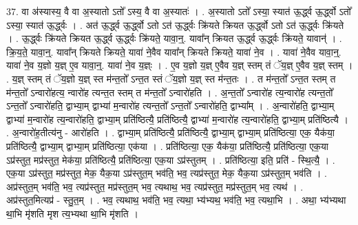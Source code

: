 \documentclass[17pt]{extarticle}
\begin{document}
37. वा अ॑स्यास्य॒ वै वा अ॒स्यातो ऽतो᳚ ऽस्य॒ वै वा अ॒स्यातः॑ । . अ॒स्यातो ऽतो᳚ ऽस्या॒ स्यात॑ ऊ॒र्द्ध्व ऊ॒र्द्ध्वो ऽतो᳚ ऽस्या॒ स्यात॑ ऊ॒र्द्ध्वः । . अत॑ ऊ॒र्द्ध्व ऊ॒र्द्ध्वो ऽतो ऽत॑ ऊ॒र्द्ध्वः क्रि॑यते क्रियत ऊ॒र्द्ध्वो ऽतो ऽत॑ ऊ॒र्द्ध्वः क्रि॑यते । . ऊ॒र्द्ध्वः क्रि॑यते क्रियत ऊ॒र्द्ध्व ऊ॒र्द्ध्वः क्रि॑यते॒ यावा॒न्॒. यावा᳚न् क्रियत ऊ॒र्द्ध्व ऊ॒र्द्ध्वः क्रि॑यते॒ यावान्॑ । . क्रि॒य॒ते॒ यावा॒न्॒. यावा᳚न् क्रियते क्रियते॒ यावा॑ ने॒वैव यावा᳚न् क्रियते क्रियते॒ यावा॑ ने॒व । . यावा॑ ने॒वैव यावा॒न्॒. यावा॑ ने॒व य॒ज्ञो य॒ज्ञ् ए॒व यावा॒न्॒. यावा॑ ने॒व य॒ज्ञ्ः । . ए॒व य॒ज्ञो य॒ज्ञ् ए॒वैव य॒ज्ञ् स्तम् तं ॅय॒ज्ञ् ए॒वैव य॒ज्ञ् स्तम् । . य॒ज्ञ् स्तम् तं ॅय॒ज्ञो य॒ज्ञ् स्त म॑न्त॒तो᳚ ऽन्त॒त स्तं ॅय॒ज्ञो य॒ज्ञ् स्त म॑न्त॒तः । . त म॑न्त॒तो᳚ ऽन्त॒त स्तम् त म॑न्त॒तो᳚ ऽन्वारो॑हत्य॒ न्वारो॑ह त्यन्त॒त स्तम् त म॑न्त॒तो᳚ ऽन्वारो॑हति । . अ॒न्त॒तो᳚ ऽन्वारो॑ह त्य॒न्वारो॑ह त्यन्त॒तो᳚ ऽन्त॒तो᳚ ऽन्वारो॑हति॒ द्वाभ्या॒म् द्वाभ्या॑ म॒न्वारो॑ह त्यन्त॒तो᳚ ऽन्त॒तो᳚ ऽन्वारो॑हति॒ द्वाभ्या᳚म् । . अ॒न्वारो॑हति॒ द्वाभ्या॒म् द्वाभ्या॑ म॒न्वारो॑ह त्य॒न्वारो॑हति॒ द्वाभ्या॒म् प्रति॑ष्ठित्यै॒ प्रति॑ष्ठित्यै॒ द्वाभ्या॑ म॒न्वारो॑ह त्य॒न्वारो॑हति॒ द्वाभ्या॒म् प्रति॑ष्ठित्यै । . अ॒न्वारो॑ह॒तीत्य॑नु - आरो॑हति । . द्वाभ्या॒म् प्रति॑ष्ठित्यै॒ प्रति॑ष्ठित्यै॒ द्वाभ्या॒म् द्वाभ्या॒म् प्रति॑ष्ठित्या॒ एक॒ यैक॑या॒ प्रति॑ष्ठित्यै॒ द्वाभ्या॒म् द्वाभ्या॒म् प्रति॑ष्ठित्या॒ एक॑या । . प्रति॑ष्ठित्या॒ एक॒ यैक॑या॒ प्रति॑ष्ठित्यै॒ प्रति॑ष्ठित्या॒ एक॒या ऽप्र॑स्तुत॒ मप्र॑स्तुत॒ मेक॑या॒ प्रति॑ष्ठित्यै॒ प्रति॑ष्ठित्या॒ एक॒या ऽप्र॑स्तुतम् । . प्रति॑ष्ठित्या॒ इति॒ प्रति॑ - स्थि॒त्यै॒ । . एक॒या ऽप्र॑स्तुत॒ मप्र॑स्तुत॒ मेक॒ यैक॒या ऽप्र॑स्तुत॒म् भव॑ति॒ भव॒ त्यप्र॑स्तुत॒ मेक॒ यैक॒या ऽप्र॑स्तुत॒म् भव॑ति । . अप्र॑स्तुत॒म् भव॑ति॒ भव॒ त्यप्र॑स्तुत॒ मप्र॑स्तुत॒म् भव॒ त्यथाथ॒ भव॒ त्यप्र॑स्तुत॒ मप्र॑स्तुत॒म् भव॒ त्यथ॑ । . अप्र॑स्तुत॒मित्यप्र॑ - स्तु॒त॒म् । . भव॒ त्यथाथ॒ भव॑ति॒ भव॒ त्यथा॒ भ्य॑भ्यथ॒ भव॑ति॒ भव॒ त्यथा॒भि । . अथा॒ भ्य॑भ्यथा था॒भि मृ॑शति मृश त्य॒भ्यथा था॒भि मृ॑शति । \newline
\pagebreak
{}
\end{document}

